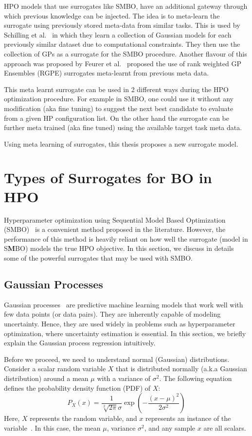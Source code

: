 \documentclass[12pt, twoside, ngerman]{report}
\begin{document}
HPO models that use surrogates like SMBO,  have an additional gateway through which previous knowledge can be injected.
The idea is to meta-learn the surrogate using previously stored meta-data from similar tasks.
This is used by Schilling et al.~\cite{Schilling2016ScalableHO} in which they learn a collection of Gaussian models for each previously similar dataset due to computational constraints.
They then use the collection of GPs as a surrogate for the SMBO procedure.
Another flavour of this approach was proposed  by Feurer et al.~\cite{Feurer2018ScalableMF} proposed the use of rank weighted GP Ensembles (RGPE) surrogates meta-learnt from previous meta data.

This meta learnt surrogate can be used in 2 different ways during the HPO optimization procedure.
For example in SMBO,  one could use it without any modification (aka fine tuning) to suggest the next best candidate to evaluate from a given HP configuration list.
On the other hand the surrogate can be further meta trained (aka fine tuned) using the available target task meta data. 

Using meta learning of surrogates,  this thesis proposes a new surrogate model.

\section{Types of Surrogates for BO in HPO}
Hyperparameter optimization using Sequential Model Based Optimization (SMBO)~\cite{NIPS2011_86e8f7ab} is a convenient method proposed in the literature.
However,  the performance of this method is heavily reliant on how well the surrogate (model in S\textbf{M}BO) models the true HPO objective.
In this section,  we discuss in details some of the powerful surrogates that may be used with SMBO.

\subsection{Gaussian Processes}

Gaussian processes~\cite{GPTutorial} are predictive machine learning models that work well with few data points (or data pairs). 
They are inherently capable of modeling uncertainty.
Hence, they are used widely in problems such as hyperparameter optimization, where uncertainty estimation is essential.
In this section, we briefly explain the Gaussian process regression intuitively.

Before we proceed,  we need to understand normal (Gaussian) distributions. 
Consider a scalar random variable $X$ that is distributed normally  (a.k.a Gaussian distribution) around a mean $\mu$ with a variance of $\sigma^2$.
The following equation defines the probability density function (PDF) of $X$: 
$$
P_X(x) = \frac{1}{\sqrt[2]{2\pi}\sigma}\exp\left(- \frac{(x - \mu)^2}{2\sigma^2}\right)
$$
Here, $X$ represents the random variable, and $x$ represents an instance of the variable~\cite{GPTutorial}.
In this case,  the mean $\mu$,  variance $\sigma^2$, and any sample $x$ are all scalars.
\end{document}
